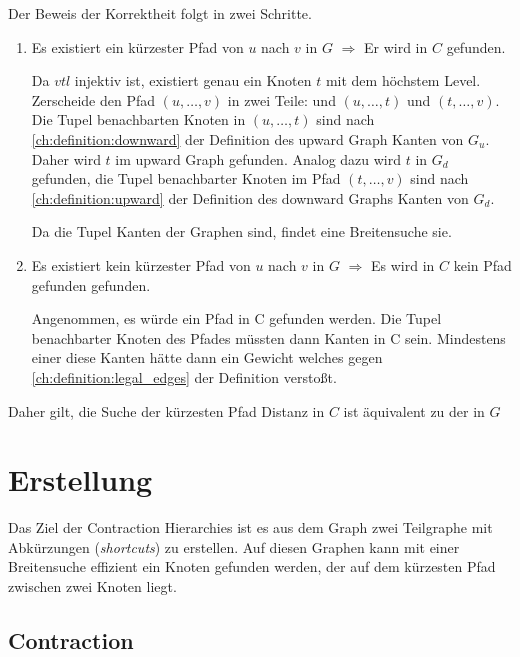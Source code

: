 \begin{beweis}
    Der Beweis der Korrektheit folgt in zwei Schritte.

    \begin{enumerate}
        \item
              Es existiert ein kürzester Pfad von $u$ nach $v$ in $G$ $\Rightarrow$ Er wird in $C$ gefunden.

              Da ${vtl}$ injektiv ist, existiert genau ein Knoten $t$ mit dem höchstem Level. Zerscheide den Pfad $(u, \dotsc, v)$ in zwei Teile:  und $(u, \dotsc, t)$ und $(t, \dotsc, v)$. Die Tupel benachbarten Knoten in $(u, \dotsc, t)$ sind nach \autoref{ch:definition:downward} der Definition des upward Graph Kanten von $G_u$. Daher wird $t$ im upward Graph gefunden. Analog dazu wird $t$ in $G_d$ gefunden, die Tupel benachbarter Knoten im Pfad $(t, \dotsc, v)$ sind nach \autoref{ch:definition:upward} der Definition des downward Graphs Kanten von $G_d$.

              Da die Tupel Kanten der Graphen sind, findet eine Breitensuche sie.

        \item
              Es existiert kein kürzester Pfad von $u$ nach $v$ in $G$ $\Rightarrow$ Es wird in $C$ kein Pfad gefunden gefunden.

              Angenommen, es würde ein Pfad in C gefunden werden. Die Tupel benachbarter Knoten des Pfades müssten dann Kanten in C sein.
              Mindestens einer diese Kanten hätte dann ein Gewicht welches gegen \autoref{ch:definition:legal_edges} der Definition verstoßt.
    \end{enumerate}

    Daher gilt, die Suche der kürzesten Pfad Distanz in $C$ ist äquivalent zu der in $G$
\end{beweis}

\section{Erstellung}

Das Ziel der Contraction Hierarchies ist es aus dem Graph zwei Teilgraphe mit Abkürzungen (\emph{shortcuts}) zu erstellen.
Auf diesen Graphen kann mit einer Breitensuche effizient ein Knoten gefunden werden, der auf dem kürzesten Pfad zwischen zwei Knoten liegt.

\subsection{Contraction}

